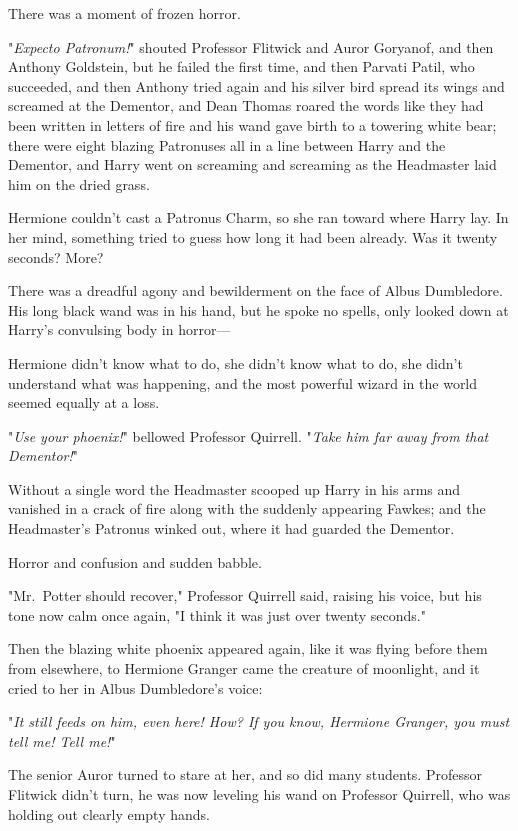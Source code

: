 There was a moment of frozen horror.

"\emph{Expecto Patronum!}" shouted Professor Flitwick and Auror Goryanof, and 
then Anthony Goldstein, but he failed the first time, and then Parvati Patil, 
who succeeded, and then Anthony tried again and his silver bird spread its 
wings and screamed at the Dementor, and Dean Thomas roared the words like they 
had been written in letters of fire and his wand gave birth to a towering white 
bear; there were eight blazing Patronuses all in a line between Harry and the 
Dementor, and Harry went on screaming and screaming as the Headmaster laid him 
on the dried grass.

Hermione couldn't cast a Patronus Charm, so she ran toward where Harry lay. In 
her mind, something tried to guess how long it had been already. Was it twenty 
seconds? More?

There was a dreadful agony and bewilderment on the face of Albus Dumbledore. 
His long black wand was in his hand, but he spoke no spells, only looked down 
at Harry's convulsing body in horror---

Hermione didn't know what to do, she didn't know what to do, she didn't 
understand what was happening, and the most powerful wizard in the world seemed 
equally at a loss.

"\emph{Use your phoenix!}" bellowed Professor Quirrell. "\emph{Take him far 
away from that Dementor!}"

Without a single word the Headmaster scooped up Harry in his arms and vanished 
in a crack of fire along with the suddenly appearing Fawkes; and the 
Headmaster's Patronus winked out, where it had guarded the Dementor.

Horror and confusion and sudden babble.

"Mr.~Potter should recover," Professor Quirrell said, raising his voice, but 
his tone now calm once again, "I think it was just over twenty seconds."

Then the blazing white phoenix appeared again, like it was flying before them 
from elsewhere, to Hermione Granger came the creature of moonlight, and it 
cried to her in Albus Dumbledore's voice:

"\emph{It still feeds on him, even here! How? If you know, Hermione Granger, 
you must tell me! Tell me!}"

The senior Auror turned to stare at her, and so did many students. Professor 
Flitwick didn't turn, he was now leveling his wand on Professor Quirrell, who 
was holding out clearly empty hands.

